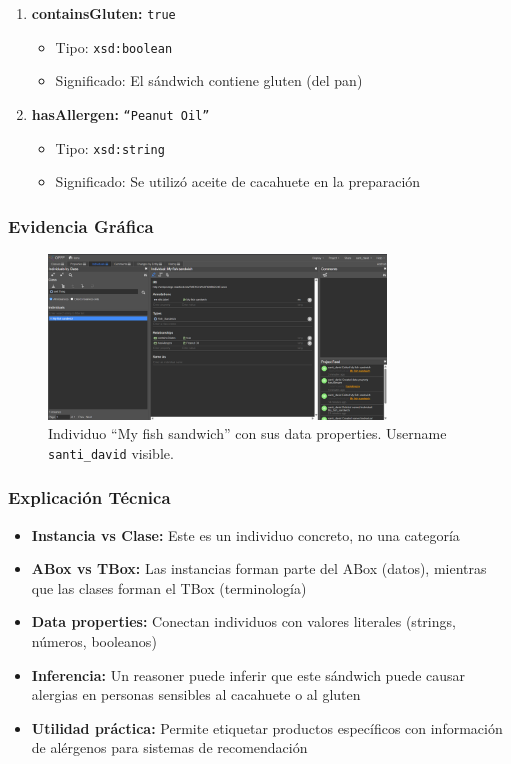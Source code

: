 \documentclass[12pt,a4paper]{article}
\begin{document}
\begin{enumerate}
    \item \textbf{containsGluten:} \texttt{true}
    \begin{itemize}
        \item Tipo: \texttt{xsd:boolean}
        \item Significado: El sándwich contiene gluten (del pan)
    \end{itemize}
    
    \item \textbf{hasAllergen:} \texttt{``Peanut Oil''}
    \begin{itemize}
        \item Tipo: \texttt{xsd:string}
        \item Significado: Se utilizó aceite de cacahuete en la preparación
    \end{itemize}
\end{enumerate}

\subsubsection{Evidencia Gráfica}

\begin{figure}[H]
    \centering
    \includegraphics[width=0.8\textwidth]{screenshots/My fish sandwich.png}
    \caption{Individuo ``My fish sandwich'' con sus data properties. Username \texttt{santi\_david} visible.}
    \label{fig:my_fish_sandwich}
\end{figure}

\subsubsection{Explicación Técnica}

\begin{itemize}
    \item \textbf{Instancia vs Clase:} Este es un individuo concreto, no una categoría
    \item \textbf{ABox vs TBox:} Las instancias forman parte del ABox (datos), mientras que las clases forman el TBox (terminología)
    \item \textbf{Data properties:} Conectan individuos con valores literales (strings, números, booleanos)
    \item \textbf{Inferencia:} Un reasoner puede inferir que este sándwich puede causar alergias en personas sensibles al cacahuete o al gluten
    \item \textbf{Utilidad práctica:} Permite etiquetar productos específicos con información de alérgenos para sistemas de recomendación
\end{itemize}
\end{document}
